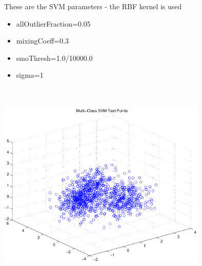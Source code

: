 \documentclass[12pt]{article}
\theoremstyle{definition}
\theoremstyle{remark}
\numberwithin{equation}{section}
\begin{document}
These are the SVM parameters - the RBF kernel is used\begin{itemize}
\item allOutlierFraction=0.05
\item mixingCoeff=0.3
\item smoThresh=1.0/10000.0
\item sigma=1
\end{itemize}
\includegraphics[width=10.0cm,height=10.0cm]{testPoints.pdf}
\end{document}
